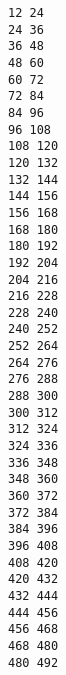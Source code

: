 \documentclass[11pt]{article}
\begin{document}
    \begin{Verbatim}[commandchars=\\\{\}]
12 24
24 36
36 48
48 60
60 72
72 84
84 96
96 108
108 120
120 132
132 144
144 156
156 168
168 180
180 192
192 204
204 216
216 228
228 240
240 252
252 264
264 276
276 288
288 300
300 312
312 324
324 336
336 348
348 360
360 372
372 384
384 396
396 408
408 420
420 432
432 444
444 456
456 468
468 480
480 492

    \end{Verbatim}

    \begin{center}
    \end{center}
    { \hspace*{\fill} \\}
    
\end{document}
